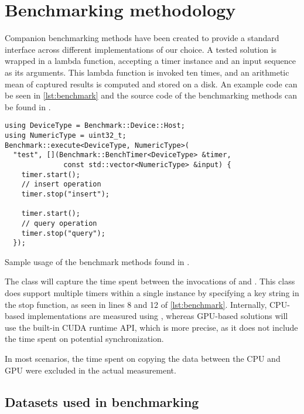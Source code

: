\section{Benchmarking methodology}\label{section:benchmarking}

Companion benchmarking methods have been created to provide a standard interface across different implementations of our choice. A tested solution is wrapped in a lambda function, accepting a timer instance and an input sequence as its arguments. This lambda function is invoked ten times, and an arithmetic mean of captured results is computed and stored on a disk. An example code can be seen in \cref{lst:benchmark} and the source code of the benchmarking methods can be found in .

\begin{listing}
  \begin{verbatim}
using DeviceType = Benchmark::Device::Host;
using NumericType = uint32_t;
Benchmark::execute<DeviceType, NumericType>(
  "test", [](Benchmark::BenchTimer<DeviceType> &timer,
              const std::vector<NumericType> &input) {
    timer.start();
    // insert operation
    timer.stop("insert");

    timer.start();
    // query operation
    timer.stop("query");
  });
  \end{verbatim}
  \caption{Sample usage of the benchmark methods found in .}
  \label{lst:benchmark}
\end{listing}

The  class will capture the time spent between the invocations of  and . This class does support multiple timers within a single instance by specifying a key string in the stop function, as seen in lines 8 and 12 of \cref{lst:benchmark}. Internally, CPU-based implementations are measured using , whereas GPU-based solutions will use the built-in CUDA runtime API, which is more precise, as it does not include the time spent on potential synchronization.

In most scenarios, the time spent on copying the data between the CPU and GPU were excluded in the actual measurement.

\subsection{Datasets used in benchmarking}\label{subsection:benchmark:datasets}

